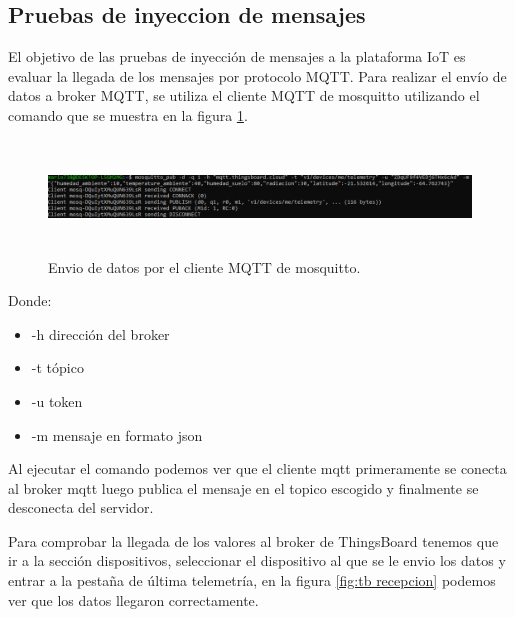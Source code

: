 \subsection{Pruebas de inyeccion de mensajes}
El objetivo de las pruebas de inyección de mensajes a la plataforma IoT es evaluar la llegada de los mensajes por protocolo MQTT.
Para realizar el envío de datos a broker MQTT, se utiliza el cliente MQTT de mosquitto utilizando el comando que se muestra en la figura \ref{fig:mosquitto pub}.

\begin{figure}[h!]
  \centering
    \includegraphics[width=\linewidth, height=3cm]{./Figures/mosquito_enviodatos.png}
  \caption{Envio de datos por el cliente MQTT de mosquitto.}
    \label{fig:mosquitto pub}
\end{figure}

Donde:
\begin{itemize}
  \item -h dirección del broker
  \item -t tópico 
  \item -u token
  \item -m mensaje en formato json
\end{itemize}

Al ejecutar el comando podemos ver que el cliente mqtt primeramente se conecta al broker mqtt luego publica el mensaje en el topico escogido y finalmente se desconecta del servidor.

Para comprobar la llegada de los valores al broker de ThingsBoard tenemos que ir a la sección dispositivos, seleccionar el dispositivo al que se le envio los datos y entrar a la pestaña de última telemetría, en la figura \ref{fig:tb recepcion} podemos ver que los datos llegaron correctamente.

